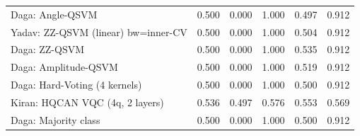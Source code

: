 \begin{tabular}{lccccc}
Daga: Angle-QSVM & 0.500 & 0.000 & 1.000 & 0.497 & 0.912\\
Yadav: ZZ-QSVM (linear) bw=inner-CV & 0.500 & 0.000 & 1.000 & 0.504 & 0.912\\
Daga: ZZ-QSVM & 0.500 & 0.000 & 1.000 & 0.535 & 0.912\\
Daga: Amplitude-QSVM & 0.500 & 0.000 & 1.000 & 0.519 & 0.912\\
Daga: Hard-Voting (4 kernels) & 0.500 & 0.000 & 1.000 & 0.500 & 0.912\\
Kiran: HQCAN VQC (4q, 2 layers) & 0.536 & 0.497 & 0.576 & 0.553 & 0.569\\
Daga: Majority class & 0.500 & 0.000 & 1.000 & 0.500 & 0.912\\

\bottomrule\end{tabular}
